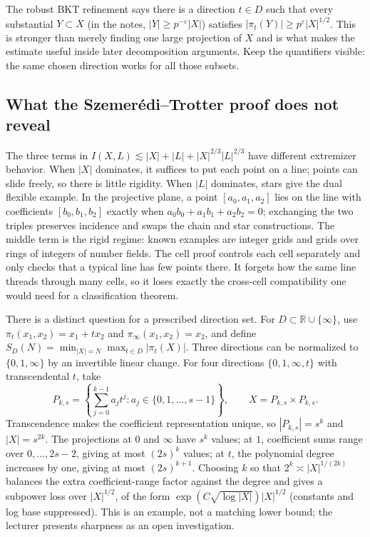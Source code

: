 The robust BKT refinement says there is a direction \(t\in D\) such that every substantial \(Y\subset X\) (in the notes, \(|Y|\ge p^{-\varepsilon}|X|\)) satisfies \(|\pi_t(Y)|\ge p^{\varepsilon}|X|^{1/2}\). This is stronger than merely finding one large projection of \(X\) and is what makes the estimate useful inside later decomposition arguments. Keep the quantifiers visible: the same chosen direction works for all those subsets.

\subsection{What the Szemerédi--Trotter proof does not reveal}\label{04-visual-computing-ii-ch033-what-the-szemeruxe9ditrotter-proof-does-not-reveal}

The three terms in \(I(X,L)\lesssim |X|+|L|+|X|^{2/3}|L|^{2/3}\) have different extremizer behavior. When \(|X|\) dominates, it suffices to put each point on a line; points can slide freely, so there is little rigidity. When \(|L|\) dominates, stars give the dual flexible example. In the projective plane, a point \([a_0,a_1,a_2]\) lies on the line with coefficients \([b_0,b_1,b_2]\) exactly when \(a_0b_0+a_1b_1+a_2b_2=0\); exchanging the two triples preserves incidence and swaps the chain and star constructions. The middle term is the rigid regime: known examples are integer grids and grids over rings of integers of number fields. The cell proof controls each cell separately and only checks that a typical line has few points there. It forgets how the same line threads through many cells, so it loses exactly the cross-cell compatibility one would need for a classification theorem.

There is a distinct question for a prescribed direction set. For \(D\subset\mathbb R\cup\{\infty\}\), use \(\pi_t(x_1,x_2)=x_1+tx_2\) and \(\pi_\infty(x_1,x_2)=x_2\), and define \(S_D(N)=\min_{|X|=N}\max_{t\in D}|\pi_t(X)|\). Three directions can be normalized to \(\{0,1,\infty\}\) by an invertible linear change. For four directions \(\{0,1,\infty,t\}\) with transcendental \(t\), take \[
P_{k,s}=\left\{\sum_{j=0}^{k-1}a_jt^j: a_j\in\{0,1,\ldots,s-1\}\right\},\qquad X=P_{k,s}\times P_{k,s}.
\] Transcendence makes the coefficient representation unique, so \(|P_{k,s}|=s^k\) and \(|X|=s^{2k}\). The projections at \(0\) and \(\infty\) have \(s^k\) values; at \(1\), coefficient sums range over \(0,\ldots,2s-2\), giving at most \((2s)^k\) values; at \(t\), the polynomial degree increases by one, giving at most \((2s)^{k+1}\). Choosing \(k\) so that \(2^k\asymp |X|^{1/(2k)}\) balances the extra coefficient-range factor against the degree and gives a subpower loss over \(|X|^{1/2}\), of the form \(\exp(C\sqrt{\log |X|})|X|^{1/2}\) (constants and log base suppressed). This is an example, not a matching lower bound; the lecturer presents sharpness as an open investigation.

